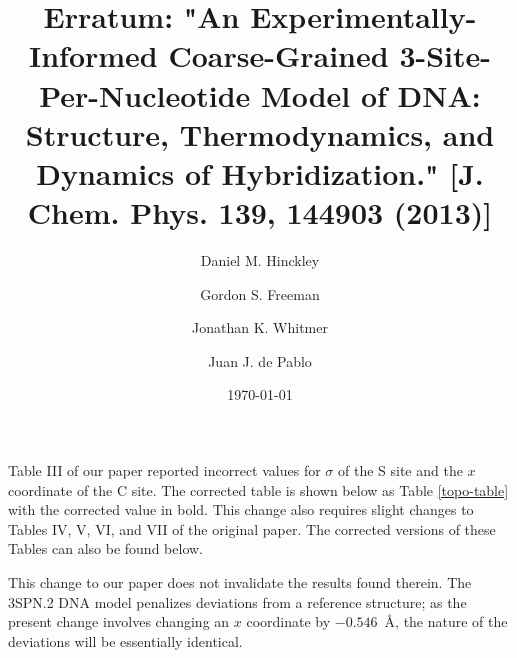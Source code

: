 \documentclass[aip,jcp, preprint, amssymb, amsmath]{revtex4-1}
\begin{document}
\newcommand{\rmsub}[2]{\ensuremath{#1_{\rm #2}}}
\newcommand{\rmsubsub}[3]{\ensuremath{{#1_{\rm #2}}_{#3}}}
\newcommand{\degree}{\ensuremath{^\circ}}

\title{Erratum: "An Experimentally-Informed Coarse-Grained 3-Site-Per-Nucleotide Model of DNA: Structure, Thermodynamics, and Dynamics of Hybridization." [J. Chem. Phys. 139, 144903 (2013)]}

\author{Daniel M. Hinckley}
\author{Gordon S. Freeman}
\author{Jonathan K. Whitmer}
\author{Juan J. de Pablo}

\date{\today}

\begin{abstract}
\end{abstract}

\maketitle

Table III of our paper\cite{Hinckley2013} reported incorrect values for $\sigma$ of the S site and the $x$ coordinate of the C site.
The corrected table is shown below as Table \ref{topo-table} with the corrected value in bold.  
This change also requires slight changes to Tables IV, V, VI, and VII of the original paper.
The corrected versions of these Tables can also be found below.

This change to our paper does not invalidate the results found therein.
The 3SPN.2 DNA model penalizes deviations from a reference structure; 
as the present change involves changing an $x$ coordinate by $-0.546$\ \AA, the nature of the deviations will be essentially identical.
\end{document}
